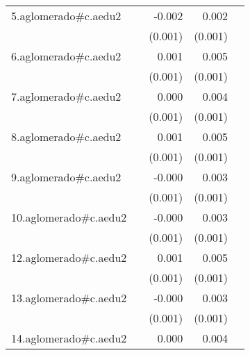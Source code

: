 {\begin{longtable}{l*{4}{D{.}{.}{-1}}}
\addlinespace
5.aglomerado#c.aedu2&                     &      -0.002         &       0.002\sym{*}  &                     \\
            &                     &     (0.001)         &     (0.001)         &                     \\
\addlinespace
6.aglomerado#c.aedu2&                     &       0.001         &       0.005\sym{***}&                     \\
            &                     &     (0.001)         &     (0.001)         &                     \\
\addlinespace
7.aglomerado#c.aedu2&                     &       0.000         &       0.004\sym{***}&                     \\
            &                     &     (0.001)         &     (0.001)         &                     \\
\addlinespace
8.aglomerado#c.aedu2&                     &       0.001         &       0.005\sym{***}&                     \\
            &                     &     (0.001)         &     (0.001)         &                     \\
\addlinespace
9.aglomerado#c.aedu2&                     &      -0.000         &       0.003\sym{**} &                     \\
            &                     &     (0.001)         &     (0.001)         &                     \\
\addlinespace
10.aglomerado#c.aedu2&                     &      -0.000         &       0.003\sym{***}&                     \\
            &                     &     (0.001)         &     (0.001)         &                     \\
\addlinespace
12.aglomerado#c.aedu2&                     &       0.001         &       0.005\sym{***}&                     \\
            &                     &     (0.001)         &     (0.001)         &                     \\
\addlinespace
13.aglomerado#c.aedu2&                     &      -0.000         &       0.003\sym{***}&                     \\
            &                     &     (0.001)         &     (0.001)         &                     \\
\addlinespace
14.aglomerado#c.aedu2&                     &       0.000         &       0.004\sym{***}&                     \\

\end{longtable}}
